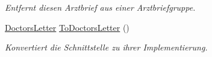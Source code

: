 \begin{CompactItemize}
\begin{CompactList}\small\item\em Entfernt diesen Arztbrief aus einer Arztbriefgruppe. \item\end{CompactList}\item 
\hyperlink{classmy_m_d_1_1_model_1_1_data_model_1_1_doctors_letter}{Doctors\-Letter} \hyperlink{interfacemy_m_d_1_1_model_interface_1_1_data_model_interface_1_1_i_doctors_letter_a52c06afbc0038d351f09b083e586b2e}{To\-Doctors\-Letter} ()
\begin{CompactList}\small\item\em Konvertiert die Schnittstelle zu ihrer Implementierung. \item\end{CompactList}\end{CompactItemize}
